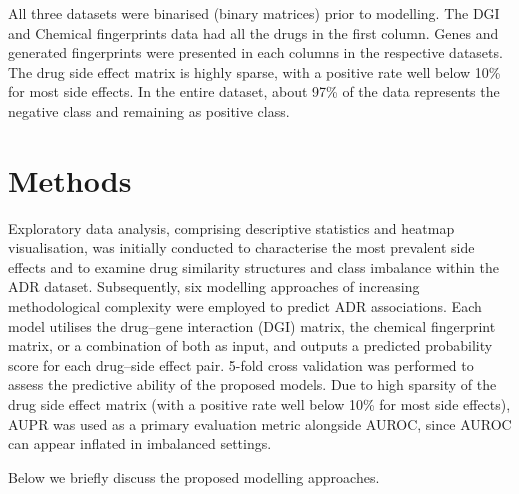 \documentclass{article}
\begin{document}
All three datasets were binarised (binary matrices) prior to modelling.
The DGI and Chemical fingerprints data had all the drugs in the first
column. Genes and generated fingerprints were presented in each columns
in the respective datasets. The drug side effect matrix is highly
sparse, with a positive rate well below 10\% for most side effects. In
the entire dataset, about 97\% of the data represents the negative class
and remaining as positive class.

\section{Methods}\label{methods}

Exploratory data analysis, comprising descriptive statistics and heatmap
visualisation, was initially conducted to characterise the most
prevalent side effects and to examine drug similarity structures and
class imbalance within the ADR dataset. Subsequently, six modelling
approaches of increasing methodological complexity were employed to
predict ADR associations. Each model utilises the drug--gene interaction
(DGI) matrix, the chemical fingerprint matrix, or a combination of both
as input, and outputs a predicted probability score for each drug--side
effect pair. 5-fold cross validation was performed to assess the
predictive ability of the proposed models. Due to high sparsity of the
drug side effect matrix (with a positive rate well below 10\% for most
side effects), AUPR was used as a primary evaluation metric alongside
AUROC, since AUROC can appear inflated in imbalanced settings.

Below we briefly discuss the proposed modelling approaches.
\end{document}
